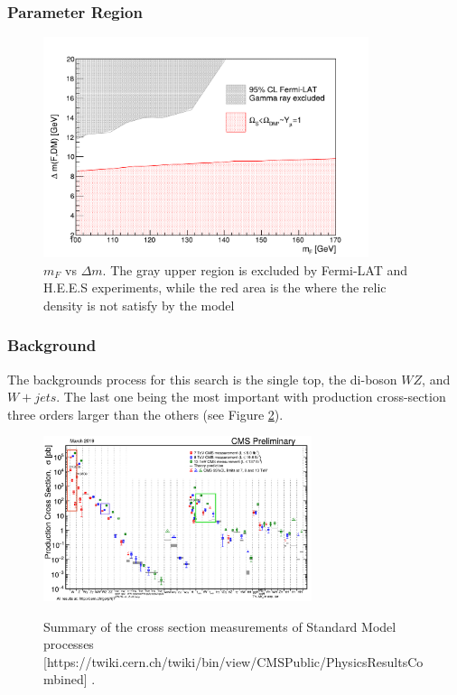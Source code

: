 \documentclass{beamer}
\begin{document}
\begin{frame}
\frametitle{Parameter Region}

\begin{figure}[!tbp]
\centering
\includegraphics[width=0.85\textwidth]{pictures/LimitPlotsTesis}%
\caption{{\scriptsize $m_F$ vs $\Delta m$. The gray upper region is excluded by Fermi-LAT and H.E.E.S experiments, while the red area is the where the relic density is not satisfy by the model}}
\label{fig7}
\end{figure}


\end{frame}
\begin{frame}
\frametitle{Background}
\begin{justify}
The backgrounds process for this search is the single top, the di-boson $WZ$, and $W+jets $. The last one being the most important with production cross-section three orders larger than the others (see Figure \ref{XSSummary}).

\end{justify}

\begin{figure}[!tbp]
\centering
\includegraphics[width=0.7\textwidth]{pictures/CrossSectionSMProcesses}\label{fig8}
\caption{{\scriptsize Summary of the cross section measurements of Standard Model processes [{\tiny https://twiki.cern.ch/twiki/bin/view/CMSPublic/PhysicsResultsCombined}]    }.}
\label{XSSummary}
\end{figure}

\end{frame}
\end{document}
